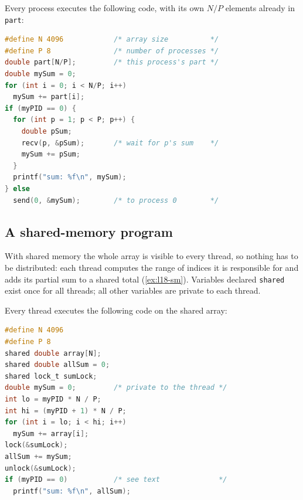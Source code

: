 \documentclass[../main.tex]{subfiles}
\begin{document}
\begin{example}
  \label{ex:l18-mp}
  Every process executes the following code, with its own $N/P$ elements
  already in \texttt{part}:
  \begin{lstlisting}[language=C, numbers=none]
#define N 4096            /* array size          */
#define P 8               /* number of processes */
double part[N/P];         /* this process's part */
double mySum = 0;
for (int i = 0; i < N/P; i++)
  mySum += part[i];
if (myPID == 0) {
  for (int p = 1; p < P; p++) {
    double pSum;
    recv(p, &pSum);       /* wait for p's sum    */
    mySum += pSum;
  }
  printf("sum: %f\n", mySum);
} else
  send(0, &mySum);        /* to process 0        */
\end{lstlisting}
\end{example}

\subsection{A shared-memory program}

With shared memory the whole array is visible to every thread, so nothing
has to be distributed: each thread computes the range of indices it is
responsible for and adds its partial sum to a shared total
(\cref{ex:l18-sm}).  Variables declared \texttt{shared} exist once for all
threads; all other variables are private to each thread.

\begin{example}
  \label{ex:l18-sm}
  Every thread executes the following code on the shared array:
  \begin{lstlisting}[language=C, numbers=none, morekeywords={shared}]
#define N 4096
#define P 8
shared double array[N];
shared double allSum = 0;
shared lock_t sumLock;
double mySum = 0;         /* private to the thread */
int lo = myPID * N / P;
int hi = (myPID + 1) * N / P;
for (int i = lo; i < hi; i++)
  mySum += array[i];
lock(&sumLock);
allSum += mySum;
unlock(&sumLock);
if (myPID == 0)           /* see text              */
  printf("sum: %f\n", allSum);
\end{lstlisting}
\end{example}
\end{document}
